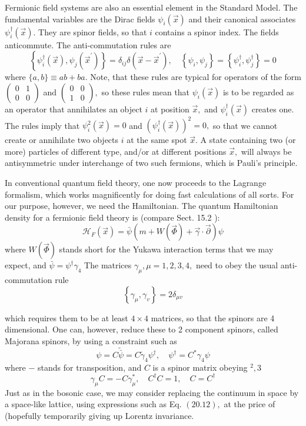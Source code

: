 \documentclass[main.tex]{subfiles}
\begin{document}
Fermionic field systems are also an essential element in the Standard Model. The fundamental variables are the Dirac fields $\psi_{i}(\vec{x})$ and their canonical associates $\psi_{i}^{\dagger}(\vec{x}) .$ They are spinor fields, so that $i$ contains a spinor index. The fields anticommute. The anti-commutation rules are
$$
\left\{\psi_{i}^{\dagger}(\vec{x}), \psi_{j}\left(\vec{x}^{\prime}\right)\right\}=\delta_{i j} \delta\left(\vec{x}-\vec{x}^{\prime}\right), \quad\left\{\psi_{i}, \psi_{j}\right\}=\left\{\psi_{i}^{\dagger}, \psi_{j}^{\dagger}\right\}=0
$$
where $\{a, b\} \equiv a b+b a .$ Note, that these rules are typical for operators of the form $\left(\begin{array}{ll}{0} & {1} \\ {0} & {0}\end{array}\right)$ and $\left(\begin{array}{ll}{0} & {0} \\ {1} & {0}\end{array}\right),$ so these rules mean that $\psi_{i}(\vec{x})$ is to be regarded as an operator that annihilates an object $i$ at position $\vec{x},$ and $\psi_{i}^{\dagger}(\vec{x})$ creates one. The rules imply that $\psi_{i}^{2}(\vec{x})=0$ and $\left(\psi_{i}^{\dagger}(\vec{x})\right)^{2}=0,$ so that we cannot create or annihilate two objects $i$ at the same spot $\vec{x}$. A state containing two (or more) particles of different type, and/or at different positions $\vec{x},$ will always be antisymmetric under interchange of two such fermions, which is Pauli's principle.

In conventional quantum field theory, one now proceeds to the Lagrange formalism, which works magnificently for doing fast calculations of all sorts. For our purpose, however, we need the Hamiltonian. The quantum Hamiltonian density for a fermionic field theory is (compare Sect. 15.2 ):
$$
\mathcal{H}_{F}(\vec{x})=\bar{\psi}(m+W(\vec{\Phi})+\vec{\gamma} \cdot \vec{\partial}) \psi
$$
where $W(\vec{\Phi})$ stands short for the Yukawa interaction terms that we may expect, and $\bar{\psi}=\psi^{\dagger} \gamma_{4}$
The matrices $\gamma_{\mu}, \mu=1,2,3,4,$ need to obey the usual anti-commutation rule
$$
\left\{\gamma_{\mu}, \gamma_{v}\right\}=2 \delta_{\mu v}
$$

which requires them to be at least $4 \times 4$ matrices, so that the spinors are 4 dimensional. One can, however, reduce these to 2 component spinors, called Majorana spinors, by using a constraint such as
$$
\psi=C \tilde{\bar{\psi}}=C \tilde{\gamma}_{4} \psi^{\dagger}, \quad \psi^{\dagger}=C^{*} \gamma_{4} \psi
$$
where $-$ stands for transposition, and $C$ is a spinor matrix obeying $^{2}, 3$
$$
\gamma_{\mu} C=-C \gamma_{\mu}^{*}, \quad C^{\dagger} C=1, \quad C=C^{\dagger}
$$
Just as in the bosonic case, we may consider replacing the continuum in space by
a space-like lattice, using expressions such as Eq. $(20.12),$ at the price of (hopefully temporarily giving up Lorentz invariance.
\end{document}

